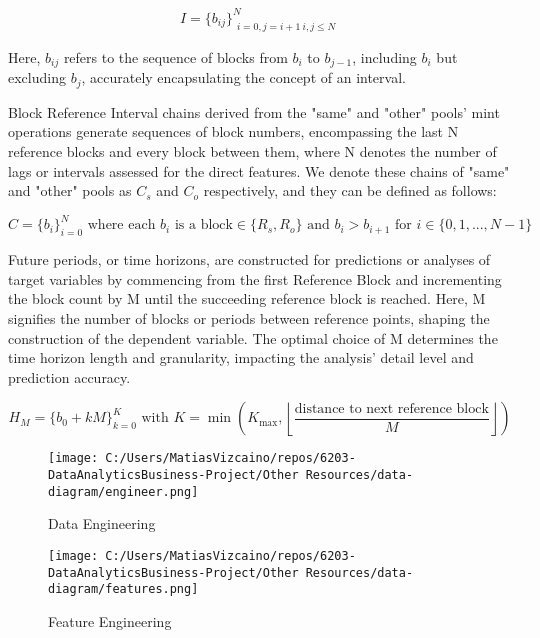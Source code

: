 \documentclass{article}
\begin{document}
\begin{equation}
I = \{b_{ij}\}_{\substack{i=0,j=i+1 \ i,j\leq N}}^N
\end{equation}

Here, $b_{ij}$ refers to the sequence of blocks from $b_i$ to $b_{j-1}$, including $b_i$ but excluding $b_j$, accurately encapsulating the concept of an interval.

Block Reference Interval chains derived from the "same" and "other" pools' mint operations generate sequences of block numbers, encompassing the last N reference blocks and every block between them, where N denotes the number of lags or intervals assessed for the direct features. We denote these chains of "same" and "other" pools as $C_{s}$ and $C_{o}$ respectively, and they can be defined as follows:

\begin{equation}
C = \{b_{i}\}_{i=0}^{N} \text{ where each } b_{i} \text{ is a block} \in \{R_s, R_o\} \text{ and } b_{i} > b_{i+1} \text{ for } i \in \{0,1,...,N-1\}
\end{equation}

Future periods, or time horizons, are constructed for predictions or analyses of target variables by commencing from the first Reference Block and incrementing the block count by M until the succeeding reference block is reached. Here, M signifies the number of blocks or periods between reference points, shaping the construction of the dependent variable. The optimal choice of M determines the time horizon length and granularity, impacting the analysis' detail level and prediction accuracy.

\begin{equation}
H_{M} = \{b_{0}+kM\}_{k=0}^{K} \text{ with } K = \min \left( K_{\text{max}}, \left\lfloor \frac{\text{distance to next reference block}}{M} \right\rfloor \right)
\end{equation}

\begin{figure}[htbp]
  \begin{minipage}{0.5\textwidth}
  \centering
  \texttt{[image: C:/Users/MatiasVizcaino/repos/6203-DataAnalyticsBusiness-Project/Other Resources/data-diagram/engineer.png]}
  \caption{Data Engineering}
  \label{fig:data-diagram-engineer}
  \end{minipage}
  \begin{minipage}{0.45\textwidth}
  \centering
  \texttt{[image: C:/Users/MatiasVizcaino/repos/6203-DataAnalyticsBusiness-Project/Other Resources/data-diagram/features.png]}
  \caption{Feature Engineering}
  \label{fig:data-diagram-features}
  \end{minipage}
  \end{figure}
\end{document}
